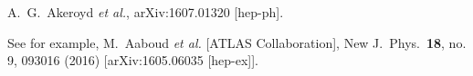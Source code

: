 \documentclass[%
showkeys,12pt,
preprint,preprintnumbers,nofootinbib,
groupedaddress,superscriptaddress,amsmath,amssymb]{revtex4}
\numberwithin{equation}{section}
\begin{document}
\begin{thebibliography}{99}
  A.~G.~Akeroyd {\it et al.},
  arXiv:1607.01320 [hep-ph].



See for example,
M.~Aaboud {\it et al.} [ATLAS Collaboration],
  New J.\ Phys.\  {\bf 18}, no. 9, 093016 (2016)
  [arXiv:1605.06035 [hep-ex]].


  
  


    

\fi
  

  
\end{thebibliography}
\end{document}
